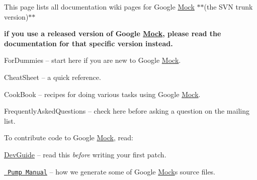 This page lists all documentation wiki pages for Google \mbox{\hyperlink{class_mock}{Mock}} $\ast$$\ast$(the S\+VN trunk version)$\ast$$\ast$
\begin{DoxyItemize}
\item {\bfseries{if you use a released version of Google \mbox{\hyperlink{class_mock}{Mock}}, please read the documentation for that specific version instead.}}
\begin{DoxyItemize}
\item For\+Dummies -- start here if you are new to Google \mbox{\hyperlink{class_mock}{Mock}}.
\item Cheat\+Sheet -- a quick reference.
\item Cook\+Book -- recipes for doing various tasks using Google \mbox{\hyperlink{class_mock}{Mock}}.
\item Frequently\+Asked\+Questions -- check here before asking a question on the mailing list.
\end{DoxyItemize}
\end{DoxyItemize}

To contribute code to Google \mbox{\hyperlink{class_mock}{Mock}}, read\+:


\begin{DoxyItemize}
\item \mbox{\hyperlink{googletest_2docs_2_dev_guide_8md}{Dev\+Guide}} -- read this {\itshape before} writing your first patch.
\item \href{http://code.google.com/p/googletest/wiki/PumpManual}{\texttt{ Pump Manual}} -- how we generate some of Google \mbox{\hyperlink{class_mock}{Mock}}\textquotesingle{}s source files. 
\end{DoxyItemize}
